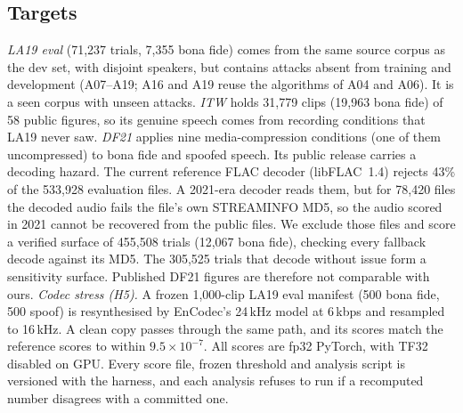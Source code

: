 \documentclass[conference]{IEEEtran}
\begin{document}
\subsection{Targets}
\label{sec:targets}
\emph{LA19 eval} (71,237 trials, 7,355 bona fide) comes from the same source
corpus as the dev set, with disjoint speakers, but contains attacks absent from
training and development (A07--A19; A16 and A19 reuse the algorithms of A04 and
A06). It is a seen corpus with unseen attacks. \emph{ITW}
\cite{muller22_in_the_wild} holds 31,779 clips (19,963 bona fide) of 58 public
figures, so its genuine speech comes from recording conditions that LA19 never
saw. \emph{DF21} \cite{liu23_asvspoof2021} applies nine media-compression
conditions (one of them uncompressed) to bona fide and spoofed speech. Its
public release carries a decoding hazard. The current reference FLAC decoder (libFLAC~1.4) rejects 43\% of the
533,928 evaluation files. A 2021-era decoder reads them, but for 78,420 files
the decoded audio fails the file's own STREAMINFO MD5, so the audio scored in
2021 cannot be recovered from the public files. We exclude those files and
score a verified surface of 455,508 trials (12,067 bona fide), checking every
fallback decode against its MD5. The 305,525 trials that decode without issue
form a sensitivity surface. Published DF21 figures are therefore not comparable
with ours. \emph{Codec stress (H5).} A frozen 1,000-clip LA19 eval manifest
(500 bona fide, 500 spoof) is resynthesised by EnCodec's 24\,kHz model at
6\,kbps \cite{defossez23_encodec} and resampled to 16\,kHz. A clean copy passes
through the same path, and its scores match the reference scores to within
\(9.5{\times}10^{-7}\). All scores are fp32 PyTorch, with TF32 disabled on GPU.
Every score file, frozen threshold and analysis script is versioned with the
harness, and each analysis refuses to run if a recomputed number disagrees with
a committed one.
\end{document}
